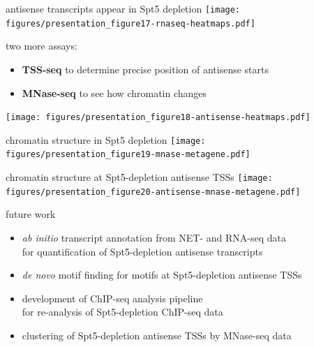 \documentclass[aspectratio=169]{beamer}
\begin{document}
\begin{frame}{antisense transcripts appear in Spt5 depletion}
    \centering
    \texttt{[image: figures/presentation\_figure17-rnaseq-heatmaps.pdf]}
\end{frame}

\begin{frame}
    two more assays:
    \begin{itemize}
        \item \textbf{TSS-seq} to determine precise position of antisense starts
        \item \textbf{MNase-seq} to see how chromatin changes
    \end{itemize}
\end{frame}

\begin{frame}
    \texttt{[image: figures/presentation\_figure18-antisense-heatmaps.pdf]}
\end{frame}

\begin{frame}{chromatin structure in Spt5 depletion}
    \texttt{[image: figures/presentation\_figure19-mnase-metagene.pdf]}
\end{frame}

\begin{frame}{chromatin structure at Spt5-depletion antisense TSSs}
    \texttt{[image: figures/presentation\_figure20-antisense-mnase-metagene.pdf]}
\end{frame}

\begin{frame}{future work}
    \begin{itemize}
        \setlength{\itemsep}{1em}
        \item \textit{ab initio} transcript annotation from NET- and RNA-seq data\\for quantification of Spt5-depletion antisense transcripts
        \item \textit{de novo} motif finding for motifs at Spt5-depletion antisense TSSs
        \item development of ChIP-seq analysis pipeline\\for re-analysis of Spt5-depletion ChIP-seq data
        \item clustering of Spt5-depletion antisense TSSs by MNase-seq data
    \end{itemize}
\end{frame}
\end{document}
